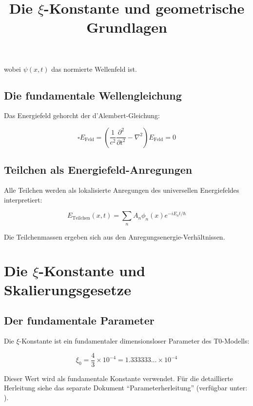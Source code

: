 \documentclass[12pt,a4paper]{report}
\begin{document}
	wobei $\psi(x,t)$ das normierte Wellenfeld ist.
	
	\subsection{Die fundamentale Wellengleichung}
	
	Das Energiefeld gehorcht der d'Alembert-Gleichung:
	
	\begin{equation}
		\square E_{\text{Feld}} = \left(\frac{1}{c^2}\frac{\partial^2}{\partial t^2} - \nabla^2\right) E_{\text{Feld}} = 0
	\end{equation}
	
	\subsection{Teilchen als Energiefeld-Anregungen}
	
	Alle Teilchen werden als lokalisierte Anregungen des universellen Energiefeldes interpretiert:
	
	\begin{equation}
		E_{\text{Teilchen}}(x,t) = \sum_n A_n \phi_n(x) e^{-iE_n t/\hbar}
	\end{equation}
	
	Die Teilchenmassen ergeben sich aus den Anregungsenergie-Verhältnissen.
	
	\title{Die $\xi$-Konstante und geometrische Grundlagen}
\maketitle
	
\section{Die $\xi$-Konstante und Skalierungsgesetze}

\subsection{Der fundamentale Parameter}

Die $\xi$-Konstante ist ein fundamentaler dimensionsloser Parameter des T0-Modells:

\begin{equation}
	\boxed{\xi_0 = \frac{4}{3} \times 10^{-4} = 1.333333... \times 10^{-4}}
\end{equation}

	Dieser Wert wird als fundamentale Konstante verwendet. Für die detaillierte Herleitung 
	siehe das separate Dokument ``Parameterherleitung'' 
	(verfügbar unter: ).
\end{document}
